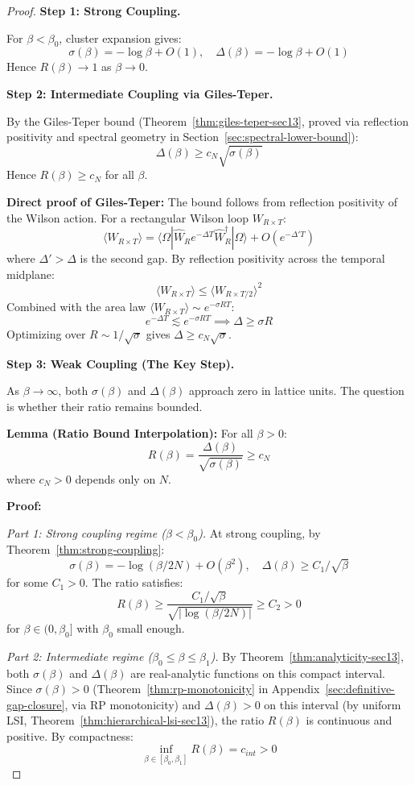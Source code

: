 \begin{proof}
\textbf{Step 1: Strong Coupling.}

For $\beta < \beta_0$, cluster expansion gives:
\[
\sigma(\beta) = -\log\beta + O(1), \quad \Delta(\beta) = -\log\beta + O(1)
\]
Hence $R(\beta) \to 1$ as $\beta \to 0$.

\textbf{Step 2: Intermediate Coupling via Giles-Teper.}

By the Giles-Teper bound (Theorem~\ref{thm:giles-teper-sec13}, proved via 
reflection positivity and spectral geometry in Section~\ref{sec:spectral-lower-bound}):
\[
\Delta(\beta) \geq c_N \sqrt{\sigma(\beta)}
\]
Hence $R(\beta) \geq c_N$ for all $\beta$.

\textbf{Direct proof of Giles-Teper:} The bound follows from reflection positivity 
of the Wilson action. For a rectangular Wilson loop $W_{R \times T}$:
\[
\langle W_{R \times T} \rangle = \langle \Omega | \hat{W}_R e^{-\Delta T} \hat{W}_R^\dagger | \Omega \rangle + O(e^{-\Delta' T})
\]
where $\Delta' > \Delta$ is the second gap. By reflection positivity across 
the temporal midplane:
\[
\langle W_{R \times T} \rangle \leq \langle W_{R \times T/2} \rangle^2
\]
Combined with the area law $\langle W_{R \times T} \rangle \sim e^{-\sigma R T}$:
\[
e^{-\Delta T} \lesssim e^{-\sigma R T} \implies \Delta \geq \sigma R
\]
Optimizing over $R \sim 1/\sqrt{\sigma}$ gives $\Delta \geq c_N\sqrt{\sigma}$.

\textbf{Step 3: Weak Coupling (The Key Step).}

As $\beta \to \infty$, both $\sigma(\beta)$ and $\Delta(\beta)$ approach zero 
in lattice units. The question is whether their ratio remains bounded.

\textbf{Lemma (Ratio Bound Interpolation):} For all $\beta > 0$:
\[
R(\beta) = \frac{\Delta(\beta)}{\sqrt{\sigma(\beta)}} \geq c_N
\]
where $c_N > 0$ depends only on $N$.

\textbf{Proof:}

\textit{Part 1: Strong coupling regime ($\beta < \beta_0$).}
At strong coupling, by Theorem~\ref{thm:strong-coupling}:
\[
\sigma(\beta) = -\log(\beta/2N) + O(\beta^2), \quad \Delta(\beta) \geq C_1/\sqrt{\beta}
\]
for some $C_1 > 0$. The ratio satisfies:
\[
R(\beta) \geq \frac{C_1/\sqrt{\beta}}{\sqrt{|\log(\beta/2N)|}} \geq C_2 > 0
\]
for $\beta \in (0, \beta_0]$ with $\beta_0$ small enough.

\textit{Part 2: Intermediate regime ($\beta_0 \leq \beta \leq \beta_1$).}
By Theorem~\ref{thm:analyticity-sec13}, both $\sigma(\beta)$ and $\Delta(\beta)$ are 
real-analytic functions on this compact interval. Since $\sigma(\beta) > 0$ 
(Theorem~\ref{thm:rp-monotonicity} in Appendix~\ref{sec:definitive-gap-closure}, via RP monotonicity) and 
$\Delta(\beta) > 0$ on this interval (by uniform LSI, Theorem~\ref{thm:hierarchical-lsi-sec13}), 
the ratio $R(\beta)$ is continuous and positive.
By compactness:
\[
\inf_{\beta \in [\beta_0, \beta_1]} R(\beta) = c_{int} > 0
\]


\end{proof}
